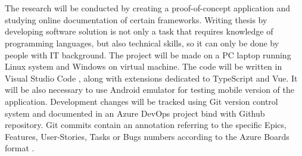 
\chapter{}%
\label{ch:methodologie}







The research will be conducted by creating a proof-of-concept application and studying online documentation of certain frameworks. Writing thesis by developing software solution is not only a task that requires knowledge of programming languages, but also technical skills, so it can only be done by people with IT background. The project will be made on a PC laptop running Linux system and Windows on virtual machine. The code will be written in Visual Studio Code \autocite{Vscode}, along with extensions dedicated to TypeScript and Vue. It will be also necessary to use Android emulator for testing mobile version of the application. Development changes will be tracked using Git version control system and documented in an Azure DevOps project bind with Github \autocite{Github} repository. 
Git commits contain an annotation referring to the specific Epics, Features, User-Stories, Tasks or Bugs numbers according to the Azure Boards format \autocite{AzureBoards}.

